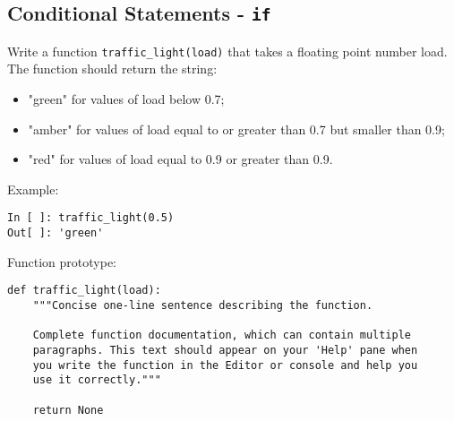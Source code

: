 \subsection{Conditional Statements - {\tt if}}

Write a function {\tt traffic\_light(load)} that takes a floating point number load. The function should return the string:

\begin{itemize}
	\item "green" for values of load below 0.7;
	\item "amber" for values of load equal to or greater than 0.7 but smaller than 0.9;
	\item "red" for values of load equal to 0.9 or greater than 0.9.
\end{itemize}

Example:

\begin{lstlisting}[frame=single]
In [ ]: traffic_light(0.5)
Out[ ]: 'green'
\end{lstlisting}

Function prototype:

\begin{lstlisting}[frame=single]
def traffic_light(load):
    """Concise one-line sentence describing the function.

    Complete function documentation, which can contain multiple
    paragraphs. This text should appear on your 'Help' pane when
    you write the function in the Editor or console and help you
    use it correctly."""

    return None
\end{lstlisting}